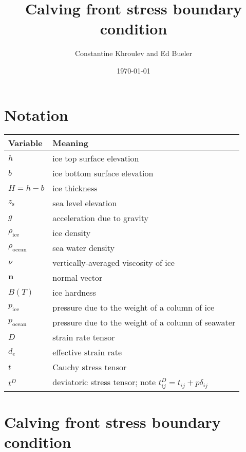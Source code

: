 \documentclass[11pt]{article}
\date{\today}
\title{Calving front stress boundary condition}
\author{Constantine Khroulev and Ed Bueler}
\begin{document}
\maketitle
\newcommand{\diff}[2]{\frac{\partial #1}{\partial #2}}
\newcommand{\n}{\mathbf{n}}
\newcommand{\nx}{\n_{x}}
\newcommand{\ny}{\n_{y}}
\newcommand{\nz}{\n_{z}}
\newcommand{\psw}{p_{\text{ocean}}}
\newcommand{\pice}{p_{\text{ice}}}
\newcommand{\rhoi}{\rho_{\text{ice}}}
\newcommand{\rhosw}{\rho_{\text{ocean}}}
\newcommand{\zs}{z_{\text{s}}}
\newcommand{\td}[1]{t^{D}_{#1}}
\newcommand{\D}{\displaystyle}
\newcommand{\dx}{\Delta x}
\newcommand{\dy}{\Delta y}
\newcommand{\viscosity}{\nu}

\section{Notation}
\label{sec-1}

\begin{center}
\begin{tabular}{ll}
\textbf{\textbf{Variable}} & \textbf{\textbf{Meaning}}\\
\hline
$h$ & ice top surface elevation\\
$b$ & ice bottom surface elevation\\
$H = h - b$ & ice thickness\\
$\zs$ & sea level elevation\\
$g$ & acceleration due to gravity\\
$\rhoi$ & ice density\\
$\rhosw$ & sea water density\\
$\viscosity$ & vertically-averaged viscosity of ice\\
$\n$ & normal vector\\
$B(T)$ & ice hardness\\
$\pice$ & pressure due to the weight of a column of ice\\
$\psw$ & pressure due to the weight of a column of seawater\\
$D$ & strain rate tensor\\
$d_{e}$ & effective strain rate\\
$t$ & Cauchy stress tensor\\
$t^{D}$ & deviatoric stress tensor; note $\td{ij} = t_{ij} + p \delta_{ij}$\\
\end{tabular}
\end{center}

\section{Calving front stress boundary condition}
\label{sec-2}
\end{document}
